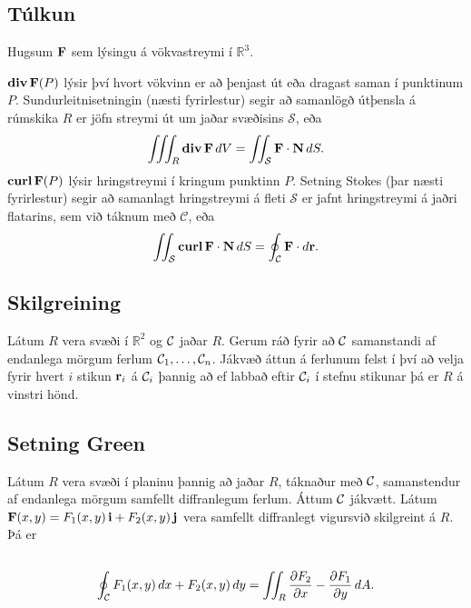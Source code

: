 \documentclass[a4paper,10pt,icelandic]{sphinxmanual}
\begin{document}
\subsection{Túlkun}
\label{Kafli6:tulkun}
Hugsum \(\mbox{${\bf F}$}\) sem lýsingu á vökvastreymi í
\({\mathbb  R}^3\).

\(\mbox{${\rm\bf div\,}$}\mbox{${\bf F}$}(P)\) lýsir því hvort
vökvinn er að þenjast út eða dragast saman í punktinum \(P\).
Sundurleitnisetningin (næsti fyrirlestur) segir að samanlögð útþensla á
rúmskika \(R\) er jöfn streymi út um jaðar svæðisins
\(\mathcal{S}\), eða
\begin{gather}
\begin{split}\displaystyle \int\!\!\!\int\!\!\!\int_R\mbox{${\rm\bf div\,}$}\mbox{${\bf F}$}\,dV=\int\!\!\!\int_{\mathcal{S}} \mbox{${\bf F}$}\cdot\mbox{${\bf N}$}\,dS.\end{split}\notag
\end{gather}
\(\mbox{${\rm\bf curl\,}$}\mbox{${\bf F}$}(P)\) lýsir hringstreymi í
kringum punktinn \(P\). Setning Stokes (þar næsti fyrirlestur) segir
að samanlagt hringstreymi á fleti \(\mathcal{S}\) er jafnt
hringstreymi á jaðri flatarins, sem við táknum með \(\mathcal{C}\),
eða
\begin{gather}
\begin{split}\displaystyle \int\!\!\!\int_{\cal S} \mbox{${\rm\bf curl\,}$}\mbox{${\bf F}$}\cdot\mbox{${\bf N}$}\,dS=\oint_\mathcal{C} \mbox{${\bf F}$}\cdot d\mbox{${\bf r}$}.\end{split}\notag
\end{gather}

\subsection{Skilgreining}
\label{Kafli6:id7}
Látum \(R\) vera svæði í \({\mathbb  R}^2\) og \(\cal C\)
jaðar \(R\). Gerum ráð fyrir að \(\cal C\) samanstandi af endanlega mörgum ferlum \({\cal C}_1, \ldots, {\cal C}_n\). Jákvæð
áttun á ferlunum felst í því að velja fyrir hvert \(i\) stikun \(\mbox{${\bf r}$}_i\) á \({\cal C}_i\) þannig að ef labbað eftir \({\cal C}_i\) í stefnu stikunar þá er \(R\) á vinstri hönd.


\subsection{Setning Green}
\label{Kafli6:setning-green}
Látum \(R\) vera svæði í planinu þannig að jaðar \(R\), táknaður
með \(\cal C\), samanstendur af endanlega mörgum samfellt
diffranlegum ferlum. Áttum \(\cal C\) jákvætt. Látum
\(\mbox{${\bf F}$}(x,y)=F_1(x,y)\,\mbox{${\bf i}$}+F_2(x,y)\,\mbox{${\bf j}$}\)
vera samfellt diffranlegt vigursvið skilgreint á \(R\). Þá er
\begin{gather}
\begin{split}\displaystyle\end{split}\notag\\\begin{split}\oint_{\cal C}F_1(x,y)\,dx+F_2(x,y)\,dy=\int\!\!\!\int_R
\frac{\partial  F_2}{\partial x}-
\frac{\partial  F_1}{\partial y}\,dA.\end{split}\notag
\end{gather}
\end{document}
